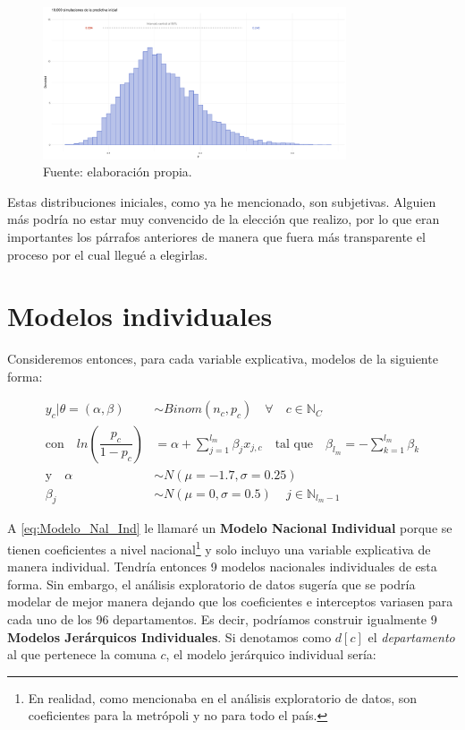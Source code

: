 \begin{figure}[h]
	\centering
	\includegraphics[width = 0.8\textwidth]{Figs/Modelado/Pred_Inicial}
	\caption{Fuente: elaboración propia.}
	\label{fig:Predictiva_Inicial}
\end{figure}

Estas distribuciones iniciales, como ya he mencionado, son subjetivas. Alguien más podría no estar muy convencido de la elección que realizo, por lo que eran importantes los párrafos anteriores de manera que fuera más transparente el proceso por el cual llegué a elegirlas.\\  

\section{Modelos individuales}

Consideremos entonces, para cada variable explicativa, modelos de la siguiente forma:

\begin{align}\label{eq:Modelo_Nal_Ind}
y_c|\theta=(\alpha,\beta) & \sim Binom(n_c,p_c) \quad \forall \quad c \in \mathbb{N}_C \nonumber \\
\text{con} \quad ln\left(\dfrac{p_c}{1-p_c}\right) &= \alpha + \sum\limits_{j=1}^{l_m} \beta_j x_{j,c} \quad \text{tal que} \quad \beta_{l_m} = -\sum\limits_{k = 1}^{l_m} \beta_k \nonumber \\
\text{y} \quad \alpha & \sim N(\mu = -1.7,\sigma = 0.25) \nonumber \\
\beta_j & \sim N(\mu = 0,\sigma = 0.5) \quad \, j \in \mathbb{N}_{l_m-1} 
\end{align}

A \eqref{eq:Modelo_Nal_Ind} le llamaré un \textbf{Modelo Nacional Individual} porque se tienen coeficientes a nivel nacional\footnote{En realidad, como mencionaba en el análisis exploratorio de datos, son coeficientes para la metrópoli y no para todo el país.} y solo incluyo una variable explicativa de manera individual. Tendría entonces 9 modelos nacionales individuales de esta forma. Sin embargo, el análisis exploratorio de datos sugería que se podría modelar de mejor manera dejando que los coeficientes e interceptos variasen para cada uno de los 96 departamentos. Es decir, podríamos construir igualmente 9 \textbf{Modelos Jerárquicos Individuales}. Si denotamos como $d[c]$ el \textit{departamento} al que pertenece la comuna $c$, el modelo jerárquico individual sería: 

